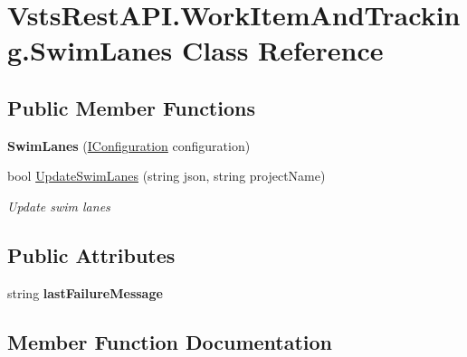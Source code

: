 \hypertarget{class_vsts_rest_a_p_i_1_1_work_item_and_tracking_1_1_swim_lanes}{}\section{Vsts\+Rest\+A\+P\+I.\+Work\+Item\+And\+Tracking.\+Swim\+Lanes Class Reference}
\label{class_vsts_rest_a_p_i_1_1_work_item_and_tracking_1_1_swim_lanes}
\subsection*{Public Member Functions}
\begin{DoxyCompactItemize}
\item 
\mbox{\label{class_vsts_rest_a_p_i_1_1_work_item_and_tracking_1_1_swim_lanes_a75431daa5e0e566f25ead06f6841b85b}} 
{\bfseries Swim\+Lanes} (\mbox{\hyperlink{interface_vsts_rest_a_p_i_1_1_i_configuration}{I\+Configuration}} configuration)
\item 
bool \mbox{\hyperlink{class_vsts_rest_a_p_i_1_1_work_item_and_tracking_1_1_swim_lanes_a4af603283af32f87e7f0de500a5cd578}{Update\+Swim\+Lanes}} (string json, string project\+Name)
\begin{DoxyCompactList}\small\item\em Update swim lanes \end{DoxyCompactList}\end{DoxyCompactItemize}
\subsection*{Public Attributes}
\begin{DoxyCompactItemize}
\item 
\mbox{\label{class_vsts_rest_a_p_i_1_1_work_item_and_tracking_1_1_swim_lanes_a79c57d0435c047cea9a3affbdf0c1368}} 
string {\bfseries last\+Failure\+Message}
\end{DoxyCompactItemize}


\subsection{Member Function Documentation}
\mbox{\label{class_vsts_rest_a_p_i_1_1_work_item_and_tracking_1_1_swim_lanes_a4af603283af32f87e7f0de500a5cd578}} 
